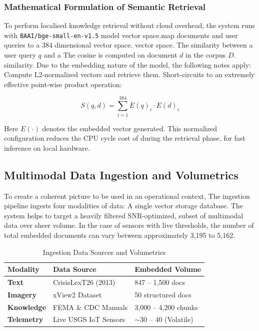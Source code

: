 \documentclass[conference]{IEEEtran}
\begin{document}
\subsubsection{Mathematical Formulation of Semantic Retrieval}
To perform localised knowledge retrieval without cloud overhead, the system runs with \texttt{BAAI/bge-small-en-v1.5} model vector space.map documents and user queries to a 384 dimensional vector space. vector space. The similarity between a user query $q$ and a The cosine is computed on document $d$ in the corpus $D$. similarity. Due to the embedding nature of the model, the following notes apply: Compute L2-normalized vectors and retrieve them. Short-circuits to an extremely effective point-wise product operation:

\begin{equation}
S(q, d) = \sum_{i=1}^{384} E(q)_i \cdot E(d)_i
\end{equation}

Here $E(\cdot)$ denotes the embedded vector generated. This normalized configuration reduces the CPU cycle cost of during the retrieval phase, for fast inference on local hardware.

\subsection{Multimodal Data Ingestion and Volumetrics}
To create a coherent picture to be used in an operational context, The ingestion pipeline ingests four modalities of data: A single vector storage database. The system helps to target a heavily filtered SNR-optimized, subset of multimodal data over sheer volume. In the case of sensors with live thresholds, the number of total embedded documents can vary between approximately 3,195 to 5,162.

\begin{table}[htbp]
\centering
\caption{Ingestion Data Sources and Volumetrics}
\label{tab:volumetrics}
\renewcommand{\arraystretch}{1.3}
\begin{tabular}{@{}p{1.2cm}p{2.5cm}p{3.5cm}@{}}
\toprule
\textbf{Modality} & \textbf{Data Source} & \textbf{Embedded Volume} \\ \midrule
\textbf{Text} & CrisisLexT26 (2013) & 847 -- 1,500 docs \\
\textbf{Imagery} & xView2 Dataset & 50 structured docs \\
\textbf{Knowledge} & FEMA \& CDC Manuals & 3,000 -- 4,200 chunks \\
\textbf{Telemetry} & Live USGS IoT Sensors & $\sim$30 -- 40 (Volatile) \\ \bottomrule
\end{tabular}
\end{table}
\end{document}
